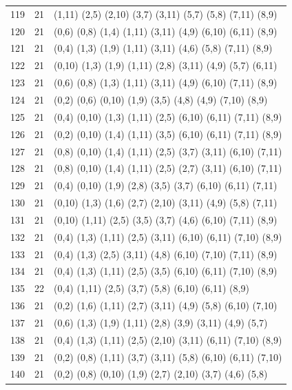 \begin{appendix}
{\begin{longtable}{lll}
119& 21 & (1,11)  (2,5)  (2,10) (3,7)   (3,11)  (5,7)   (5,8)   (7,11)  (8,9)\\
120& 21 & (0,6)   (0,8)  (1,4)  (1,11)  (3,11)  (4,9)   (6,10)  (6,11)  (8,9)\\
121& 21 & (0,4)   (1,3)  (1,9)  (1,11)  (3,11)  (4,6)   (5,8)   (7,11)  (8,9)\\
122& 21 & (0,10)  (1,3)  (1,9)  (1,11)  (2,8)   (3,11)  (4,9)   (5,7)   (6,11)\\
123& 21 & (0,6)   (0,8)  (1,3)  (1,11)  (3,11)  (4,9)   (6,10)  (7,11)  (8,9)\\
124& 21 & (0,2)   (0,6)  (0,10) (1,9)   (3,5)   (4,8)   (4,9)   (7,10)  (8,9)\\
125& 21 & (0,4)   (0,10) (1,3)  (1,11)  (2,5)   (6,10)  (6,11)  (7,11)  (8,9)\\
126& 21 & (0,2)   (0,10) (1,4)  (1,11)  (3,5)   (6,10)  (6,11)  (7,11)  (8,9)\\
127& 21 & (0,8)   (0,10) (1,4)  (1,11)  (2,5)   (3,7)   (3,11)  (6,10)  (7,11)\\
128& 21 & (0,8)   (0,10) (1,4)  (1,11)  (2,5)   (2,7)   (3,11)  (6,10)  (7,11)\\
129& 21 & (0,4)   (0,10) (1,9)  (2,8)   (3,5)   (3,7)   (6,10)  (6,11)  (7,11)\\
130& 21 & (0,10)  (1,3)  (1,6)  (2,7)   (2,10)  (3,11)  (4,9)   (5,8)   (7,11)\\
131& 21 & (0,10)  (1,11) (2,5)  (3,5)   (3,7)   (4,6)   (6,10)  (7,11)  (8,9)\\
132& 21 & (0,4)   (1,3)  (1,11) (2,5)   (3,11)  (6,10)  (6,11)  (7,10)  (8,9)\\
133& 21 & (0,4)   (1,3)  (2,5)  (3,11)  (4,8)   (6,10)  (7,10)  (7,11)  (8,9)\\
134& 21 & (0,4)   (1,3)  (1,11) (2,5)   (3,5)   (6,10)  (6,11)  (7,10)  (8,9)\\
135& 22 & (0,4)   (1,11) (2,5)  (3,7)   (5,8)   (6,10)  (6,11)  (8,9)   \\
136& 21 & (0,2)   (1,6)  (1,11) (2,7)   (3,11)  (4,9)   (5,8)   (6,10)  (7,10)\\
137& 21 & (0,6)   (1,3)  (1,9)  (1,11)  (2,8)   (3,9)   (3,11)  (4,9)   (5,7)\\
138& 21 & (0,4)   (1,3)  (1,11) (2,5)   (2,10)  (3,11)  (6,11)  (7,10)  (8,9)\\
139& 21 & (0,2)   (0,8)  (1,11) (3,7)   (3,11)  (5,8)   (6,10)  (6,11)  (7,10)\\
140& 21 & (0,2)   (0,8)  (0,10) (1,9)   (2,7)   (2,10)  (3,7)   (4,6)   (5,8)\\

\end{longtable}}
\end{appendix}
